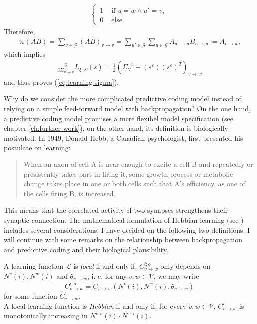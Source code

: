\documentclass[a4paper,11pt]{report}
\newcommand{\tr}{\;\text{tr}}
\begin{document}
\begin{Bew}
\begin{align*}
\begin{cases}
1&\text{ if }u=w\wedge u'=v,\\
0&\text{ else}.
\end{cases}
\end{align*}
Therefore,
\begin{align*}
\tr(AB)=\sum_{v\in\mathcal{G}}(AB)_{v\to v}=
\sum_{u'\in\mathcal{G}}\sum_{u\in\mathcal{G}}A_{u'\to u}B_{u\to u'}=
A_{v\to w},
\end{align*}
which implies
\begin{align*}
\frac{\partial}{\partial\Sigma_{w\to v}}L_{\xi,\Sigma}(s)=\frac12\left(\Sigma_{\lambda'}^{-1}-\left(s^{\varepsilon}\right)\left(s^{\varepsilon}\right)^T\right)_{v\to w}
\end{align*}
and thus proves (\ref{eq:learning-sigma}).
\end{Bew}

\begin{Par}
Why do we consider the more complicated predictive coding model instead of relying on a simple feed-forward model with backpropagation? On the one hand, a predictive coding model promises a more flexibel model specification (see chapter \ref{ch:further-work}), on the other hand, its definition is biologically motivated. In 1949, Donald Hebb, a Canadian psychologist, first presented his postulate on learning:
\begin{quote}
When an axon of cell A is near enough to excite a cell B and repeatedly or presistently takes part in firing it, some growth process or metabolic change takes place in one or both cells such that A's efficiency, as one of the cells firing B, is increased. \cite[][62]{Hebb1949}
\end{quote}
This means that the correlated activity of two synapses strengthens their synaptic connection. The mathematical formulation of Hebbian learning (see \cite{Gerstner2002}) includes several considerations. I have decided on the following two definitions. I will continue with some remarks on the relationship between backpropagation and predictive coding and their biological plausibility.
\end{Par}

\begin{Def}
A learning function $\mathcal{L}$ is \emph{local} if and only if, $C^{i;o}_{v\to w}$ only depends on $N^v(i),N^w(i)$ and $\theta_{v\to w}$, i. e. for any $v,w\in\mathcal{V}$, we may write
\[
C^{i;o}_{v\to w}=\tilde{C}_{v\to w}\left(N^v(i),N^w(i),\theta_{v\to w}\right)
\]
for some function $\tilde{C}_{v\to w}$.\\
A local learning function is \emph{Hebbian} if and only if, for every $v,w\in\mathcal{V}$, $C^i_{v\to w}$ is monotonically increasing in $N^{v:o}(i)\cdot N^{w:i}(i)$.
\end{Def}
\end{document}

